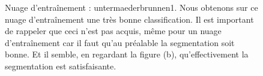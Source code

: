 \documentclass[a4paper, onecolumn, 11pt]{article}
\begin{document}
\begin{figure}[h]
    \caption{Nuage d'entraînement : untermaederbrunnen1. Nous obtenons sur ce nuage d'entraînement une très bonne classification. Il est important de rappeler que ceci n'est pas acquis, même pour un nuage d'entraînement car il faut qu'au préalable la segmentation soit bonne. Et il semble, en regardant la figure (b), qu'effectivement la segmentation est satisfaisante.}
    \label{fig:untermaederbrunnen1}
\end{figure}

\begin{figure}[h]
    \centering
    \qquad
    \qquad

\end{figure}
\end{document}
